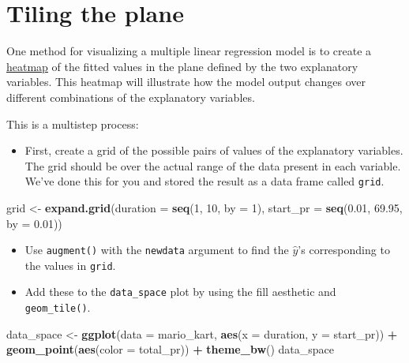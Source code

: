 \documentclass[
]{book}
\newenvironment{Shaded}{\begin{snugshade}}{\end{snugshade}}
\newcommand{\DataTypeTok}[1]{\textcolor[rgb]{0.13,0.29,0.53}{#1}}
\newcommand{\DecValTok}[1]{\textcolor[rgb]{0.00,0.00,0.81}{#1}}
\newcommand{\FloatTok}[1]{\textcolor[rgb]{0.00,0.00,0.81}{#1}}
\newcommand{\KeywordTok}[1]{\textcolor[rgb]{0.13,0.29,0.53}{\textbf{#1}}}
\newcommand{\NormalTok}[1]{#1}
\newcommand{\OperatorTok}[1]{\textcolor[rgb]{0.81,0.36,0.00}{\textbf{#1}}}
\newcommand{\StringTok}[1]{\textcolor[rgb]{0.31,0.60,0.02}{#1}}
\providecommand{\tightlist}{%
  \setlength{\itemsep}{0pt}\setlength{\parskip}{0pt}}
\begin{document}
\hypertarget{tiling-the-plane}{%
\section{Tiling the plane}\label{tiling-the-plane}}

One method for visualizing a multiple linear regression model is to create a \href{https://en.wikipedia.org/wiki/Heat_map}{heatmap} of the fitted values in the plane defined by the two explanatory variables. This heatmap will illustrate how the model output changes over different combinations of the explanatory variables.

This is a multistep process:

\begin{itemize}
\tightlist
\item
  First, create a grid of the possible pairs of values of the explanatory variables. The grid should be over the actual range of the data present in each variable. We've done this for you and stored the result as a data frame called \texttt{grid}.
\end{itemize}

\begin{Shaded}
\begin{Highlighting}[]
\NormalTok{grid <-}\StringTok{ }\KeywordTok{expand.grid}\NormalTok{(}\DataTypeTok{duration =} \KeywordTok{seq}\NormalTok{(}\DecValTok{1}\NormalTok{, }\DecValTok{10}\NormalTok{, }\DataTypeTok{by =} \DecValTok{1}\NormalTok{), }\DataTypeTok{start_pr =} \KeywordTok{seq}\NormalTok{(}\FloatTok{0.01}\NormalTok{, }\FloatTok{69.95}\NormalTok{, }\DataTypeTok{by =} \FloatTok{0.01}\NormalTok{))}
\end{Highlighting}
\end{Shaded}

\begin{itemize}
\item
  Use \texttt{augment()} with the \texttt{newdata} argument to find the \(\hat{y}\)'s corresponding to the values in \texttt{grid}.
\item
  Add these to the \texttt{data\_space} plot by using the fill aesthetic and \texttt{geom\_tile()}.
\end{itemize}

\begin{Shaded}
\begin{Highlighting}[]
\NormalTok{data_space <-}\StringTok{ }\KeywordTok{ggplot}\NormalTok{(}\DataTypeTok{data =}\NormalTok{ mario_kart, }
                     \KeywordTok{aes}\NormalTok{(}\DataTypeTok{x =}\NormalTok{ duration, }\DataTypeTok{y =}\NormalTok{ start_pr)) }\OperatorTok{+}\StringTok{ }
\StringTok{  }\KeywordTok{geom_point}\NormalTok{(}\KeywordTok{aes}\NormalTok{(}\DataTypeTok{color =}\NormalTok{ total_pr)) }\OperatorTok{+}\StringTok{ }
\StringTok{  }\KeywordTok{theme_bw}\NormalTok{()}
\NormalTok{data_space}
\end{Highlighting}
\end{Shaded}
\end{document}
